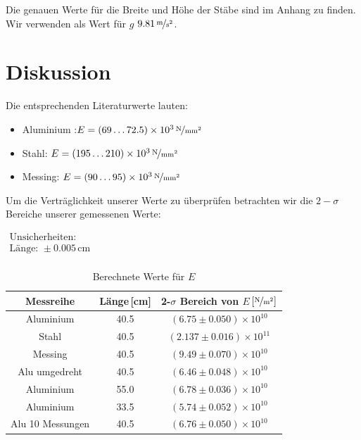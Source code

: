 \documentclass[11pt,a4paper]{article}
\begin{document}
Die genauen Werte f\"ur die Breite und H\"ohe der St\"abe sind im Anhang zu finden. Wir verwenden als Wert f\"ur $g$ $9.81\,\nicefrac{\mathrm{m}}{\mathrm{s}^2}$.

\section{Diskussion}

Die entsprechenden Literaturwerte lauten:

\begin{itemize}
\item Aluminium :$E=(69\ldots72.5)\times10^3\,\nicefrac{\mathrm{N}}{\mathrm{mm^2}}$
\item Stahl: $E=(195\ldots210)\times10^3\,\nicefrac{\mathrm{N}}{\mathrm{mm^2}}$
\item Messing: $E=(90\ldots95)\times10^3\,\nicefrac{\mathrm{N}}{\mathrm{mm^2}}$
\end{itemize}

Um die Vertr\"aglichkeit unserer Werte zu \"uberpr\"ufen betrachten wir die $2-\sigma$ Bereiche unserer gemessenen Werte:

\begin{table}[h]
\centering
\caption{Berechnete Werte f\"ur $E$} \vspace{11pt}
$\begin{array}{l}
\textrm{Unsicherheiten:}\\
\textrm{L\"ange: } \pm 0.005\,\textrm{cm}\\
\end{array}$
\begin{tabular}{ccc}
\toprule
\textrm{Messreihe} & \textrm{L\"ange}\,[\textrm{cm}] & \textrm{2-}$\sigma$\textrm{ Bereich von }$E$\,$\left[\nicefrac{\mathrm{N}}{\mathrm{m^2}}\right]$ \\
\midrule 
\textrm{Aluminium} & 40.5 & $(6.75\pm0.050)\times10^{10}$ \\
\textrm{Stahl} & 40.5 & $(2.137\pm0.016)\times10^{11}$ \\
\textrm{Messing} & 40.5 & $(9.49\pm0.070)\times10^{10}$ \\
\hline
\textrm{Alu umgedreht} & 40.5 & $(6.46\pm0.048)\times10^{10}$ \\
\textrm{Aluminium} & 55.0 & $(6.78\pm0.036)\times10^{10}$ \\ 
\textrm{Aluminium} & 33.5 & $(5.74\pm0.052)\times10^{10}$ \\ 
\textrm{Alu 10 Messungen} & 40.5 & $(6.76\pm0.050)\times10^{10}$ \\ 
\bottomrule
\end{tabular}
\label{Tab:1}
\end{table}
\end{document}
